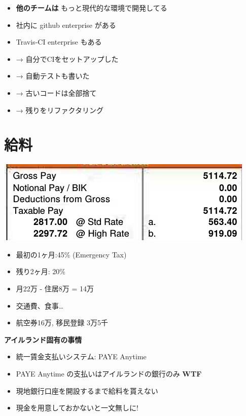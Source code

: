 \begin{itemize}
\item \textbf{他のチームは} もっと現代的な環境で開発してる
\item 社内に github enterprise がある
\item Travis-CI enterprise もある
\item → 自分でCIをセットアップした
\item → 自動テストも書いた
\item → 古いコードは全部捨て
\item → 残りをリファクタリング
\end{itemize}

\section{給料}
\label{sec-14}

\begin{container-fluid}
\begin{row-fluid}
\begin{span6}
\includegraphics{img/static/pay.png}

\begin{itemize}
\item 最初の1ヶ月:45\% (Emergency Tax)

\item 残り2ヶ月: 20\%

\item 月22万 - 住居8万 = 14万

\item 交通費、食事\ldots{}

\item 航空券16万, 移民登録 3万5千
\end{itemize}
\end{span6}
\begin{span6}
\textbf{アイルランド固有の事情}

\begin{itemize}
\item 統一賃金支払いシステム: PAYE Anytime
\item PAYE Anytime の支払いはアイルランドの銀行のみ \textbf{WTF}
\item 現地銀行口座を開設するまで給料を貰えない
\item 現金を用意しておかないと一文無しに!
\end{itemize}
\end{span6}
\end{row-fluid}
\end{container-fluid}

